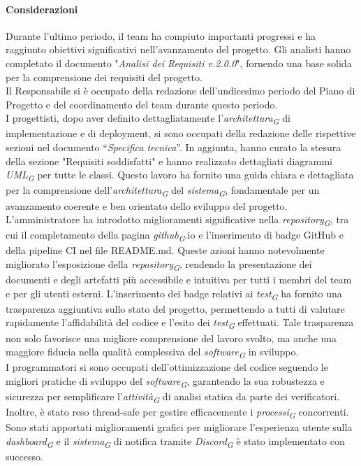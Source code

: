 \paragraph{Considerazioni}
Durante l'ultimo periodo, il team ha compiuto importanti progressi e ha raggiunto obiettivi significativi nell'avanzamento del progetto.
Gli analisti hanno completato il documento "\textit{Analisi dei Requisiti v.2.0.0}", fornendo una base solida per la comprensione dei requisiti del progetto. \\
Il Responsabile si è occupato della redazione dell'undicesimo periodo del Piano di Progetto e del coordinamento del team durante questo periodo. \\
I progettisti,  dopo aver definito dettagliatamente l'\textit{architettura}\textsubscript{\textit{G}} di implementazione e di deployment, si sono occupati della redazione delle rispettive sezioni nel documento “\textit{Specifica tecnica}”. In aggiunta, hanno curato la stesura della sezione "Requisiti soddisfatti" e hanno realizzato dettagliati diagrammi \textit{UML}\textsubscript{\textit{G}} per tutte le classi. Questo lavoro ha fornito una guida chiara e dettagliata per la comprensione dell'\textit{architettura}\textsubscript{\textit{G}} del \textit{sistema}\textsubscript{\textit{G}}, fondamentale per un avanzamento coerente e ben orientato dello sviluppo del progetto. \\
L'amministratore ha introdotto miglioramenti significative nella \textit{repository}\textsubscript{\textit{G}}, tra cui il completamento della pagina \textit{github}\textsubscript{\textit{G}}.io e l'inserimento di badge GitHub e della pipeline CI nel file README.md. 
Queste azioni hanno notevolmente migliorato l'esposizione della \textit{repository}\textsubscript{\textit{G}}, rendendo la presentazione dei documenti e degli artefatti più accessibile e intuitiva per tutti i membri del team e per gli utenti esterni. L'inserimento dei badge relativi ai \textit{test}\textsubscript{\textit{G}} ha fornito una trasparenza aggiuntiva sullo stato del progetto, permettendo a tutti di valutare rapidamente l'affidabilità del codice e l'esito dei \textit{test}\textsubscript{\textit{G}} effettuati. Tale trasparenza non solo favorisce una migliore comprensione del lavoro svolto, ma anche una maggiore fiducia nella qualità complessiva del \textit{software}\textsubscript{\textit{G}} in sviluppo. \\
I programmatori si sono occupati dell’ottimizzazione del codice seguendo le migliori pratiche di sviluppo del \textit{software}\textsubscript{\textit{G}}, garantendo la sua robustezza e sicurezza per semplificare l'\textit{attività}\textsubscript{\textit{G}} di analisi statica da parte dei verificatori. Inoltre, è stato reso thread-safe per gestire efficacemente i \textit{processi}\textsubscript{\textit{G}} concorrenti. Sono stati apportati miglioramenti grafici per migliorare l'esperienza utente sulla \textit{dashboard}\textsubscript{\textit{G}} e il \textit{sistema}\textsubscript{\textit{G}} di notifica tramite \textit{Discord}\textsubscript{\textit{G}} è stato implementato con successo. \\
